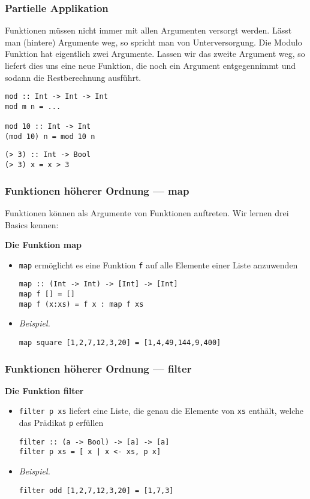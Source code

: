 \documentclass{beamer}
\begin{document}
\begin{frame}[fragile] \frametitle{Partielle Applikation}
	\footnotesize
	Funktionen müssen nicht immer mit allen Argumenten versorgt werden. Lässt man (hintere) Argumente weg, so spricht man von Unterversorgung.
	Die Modulo Funktion hat eigentlich zwei Argumente. Lassen wir das zweite Argument weg, so liefert dies uns eine neue Funktion, die noch ein Argument entgegennimmt und sodann die Restberechnung ausführt.
	\begin{lstlisting}[style=bg]
mod :: Int -> Int -> Int
mod m n = ...

mod 10 :: Int -> Int
(mod 10) n = mod 10 n
	\end{lstlisting}
	\pause
	\begin{lstlisting}[style=bg]
(> 3) :: Int -> Bool
(> 3) x = x > 3
	\end{lstlisting}
\end{frame}

\begin{frame}[fragile] \frametitle{Funktionen höherer Ordnung --- map}
	\footnotesize
	Funktionen können als Argumente von Funktionen auftreten. Wir lernen drei Basics kennen: \pause
	
	\textbf{Die Funktion map}
	\begin{itemize}
		\item \texttt{map} ermöglicht es eine Funktion \texttt{f} auf alle Elemente einer Liste anzuwenden \\[6pt]
		\begin{lstlisting}[style=bg]
map :: (Int -> Int) -> [Int] -> [Int] 
map f [] = [] 
map f (x:xs) = f x : map f xs
		\end{lstlisting}
		\item \textit{Beispiel.} \\[6pt]
		\begin{lstlisting}[style=bg]
map square [1,2,7,12,3,20] = [1,4,49,144,9,400]
		\end{lstlisting}
	\end{itemize}
\end{frame}

\begin{frame}[fragile] \frametitle{Funktionen höherer Ordnung --- filter}
	\footnotesize
	\textbf{Die Funktion filter}
	\begin{itemize}
		\item \texttt{filter p xs} liefert eine Liste, die genau die Elemente von \texttt{xs} enthält, welche das Prädikat \texttt{p} erfüllen \\[6pt]
		\begin{lstlisting}[style=bg]
filter :: (a -> Bool) -> [a] -> [a] 
filter p xs = [ x | x <- xs, p x]
		\end{lstlisting}
		\item \textit{Beispiel.} \\[6pt]
		\begin{lstlisting}[style=bg]
filter odd [1,2,7,12,3,20] = [1,7,3]
		\end{lstlisting}
	\end{itemize}
\end{frame}
\end{document}
